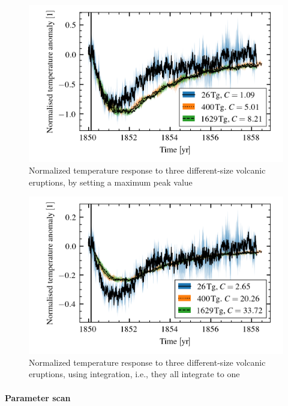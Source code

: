 \documentclass[twocol]{ametsocV5}
\begin{document}
\begin{figure}
  \begin{center}
    \includegraphics[width=0.95\linewidth]{figures/compare-waveform-max.png}
  \end{center}
  \caption{Normalized temperature response to three different-size volcanic eruptions,
    by setting a maximum peak value}%
  \label{fig:temp_norm_max}
\end{figure}

\begin{figure}
  \begin{center}
    \includegraphics[width=0.95\linewidth]{figures/compare-waveform-integrate.png}
  \end{center}
  \caption{Normalized temperature response to three different-size volcanic eruptions,
    using integration, i.e., they all integrate to one}%
  \label{fig:temp_norm_int}
\end{figure}

\paragraph{Parameter scan}
\end{document}
